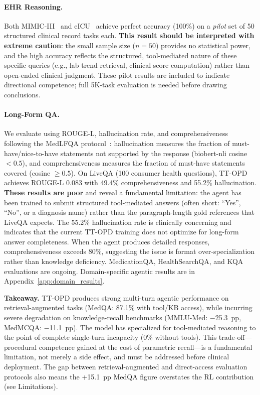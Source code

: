 \documentclass{article}
\begin{document}
\paragraph{EHR Reasoning.} Both MIMIC-III~\citep{johnson2016mimiciii} and eICU~\citep{pollard2018eicu} achieve perfect accuracy (100\%) on a \emph{pilot} set of 50 structured clinical record tasks each. \textbf{This result should be interpreted with extreme caution}: the small sample size ($n{=}50$) provides no statistical power, and the high accuracy reflects the structured, tool-mediated nature of these specific queries (e.g., lab trend retrieval, clinical score computation) rather than open-ended clinical judgment. These pilot results are included to indicate directional competence; full 5K-task evaluation is needed before drawing conclusions.

\paragraph{Long-Form QA.} We evaluate using ROUGE-L, hallucination rate, and comprehensiveness following the MedLFQA protocol~\citep{abacha2019liveqa}: hallucination measures the fraction of must-have/nice-to-have statements not supported by the response (biobert-nli cosine $< 0.5$), and comprehensiveness measures the fraction of must-have statements covered (cosine $\geq 0.5$). On LiveQA (100 consumer health questions), TT-OPD achieves ROUGE-L 0.083 with 49.4\% comprehensiveness and 55.2\% hallucination. \textbf{These results are poor} and reveal a fundamental limitation: the agent has been trained to submit structured tool-mediated answers (often short: ``Yes'', ``No'', or a diagnosis name) rather than the paragraph-length gold references that LiveQA expects. The 55.2\% hallucination rate is clinically concerning and indicates that the current TT-OPD training does not optimize for long-form answer completeness. When the agent produces detailed responses, comprehensiveness exceeds 80\%, suggesting the issue is format over-specialization rather than knowledge deficiency. MedicationQA, HealthSearchQA, and KQA evaluations are ongoing. Domain-specific agentic results are in Appendix~\ref{app:domain_results}.

\noindent\textbf{Takeaway.} TT-OPD produces strong multi-turn agentic performance on retrieval-augmented tasks (MedQA: 87.1\% with tool/KB access), while incurring severe degradation on knowledge-recall benchmarks (MMLU-Med: $-$25.3~pp, MedMCQA: $-$11.1~pp). The model has specialized for tool-mediated reasoning to the point of complete single-turn incapacity (0\% without tools). This trade-off---procedural competence gained at the cost of parametric recall---is a fundamental limitation, not merely a side effect, and must be addressed before clinical deployment. The gap between retrieval-augmented and direct-access evaluation protocols also means the +15.1~pp MedQA figure overstates the RL contribution (see Limitations).
\end{document}
